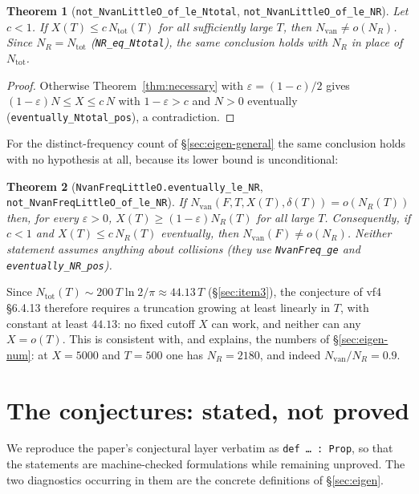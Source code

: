 \documentclass[11pt,a4paper]{article}
\newcommand{\lb}{\_\allowbreak}
\newcommand{\code}[1]{\texttt{#1}}
\newtheorem{theorem}{Theorem}[section]
\theoremstyle{definition}
\theoremstyle{remark}
\begin{document}
\begin{theorem}[\code{not\lb NvanLittleO\lb of\lb le\lb Ntotal},
\code{not\lb NvanLittleO\lb of\lb le\lb NR}]\label{thm:refute}
Let $c<1$.  If $X(T)\le c\,N_{\mathrm{tot}}(T)$ for all sufficiently large $T$, then
$N_{\mathrm{van}}\ne o(N_R)$.  Since $N_R=N_{\mathrm{tot}}$ (\code{NR\lb eq\lb Ntotal}), the
same conclusion holds with $N_R$ in place of $N_{\mathrm{tot}}$.
\end{theorem}
\begin{proof}
Otherwise Theorem~\ref{thm:necessary} with $\varepsilon=(1-c)/2$ gives
$(1-\varepsilon)N\le X\le c\,N$ with $1-\varepsilon>c$ and $N>0$ eventually
(\code{eventually\lb Ntotal\lb pos}), a contradiction.
\end{proof}

For the distinct-frequency count of \S\ref{sec:eigen-general} the same conclusion holds with
no hypothesis at all, because its lower bound is unconditional:

\begin{theorem}[\code{NvanFreqLittleO.eventually\lb le\lb NR},
\code{not\lb NvanFreqLittleO\lb of\lb le\lb NR}]
If $N_{\mathrm{van}}(F,T,X(T),\delta(T))=o(N_R(T))$ then, for every $\varepsilon>0$,
$X(T)\ge(1-\varepsilon)N_R(T)$ for all large $T$.  Consequently, if $c<1$ and
$X(T)\le c\,N_R(T)$ eventually, then $N_{\mathrm{van}}(F)\neq o(N_R)$.  Neither statement
assumes anything about collisions (they use \code{NvanFreq\lb ge} and
\code{eventually\lb NR\lb pos}).
\end{theorem}

\noindent
Since $N_{\mathrm{tot}}(T)\sim200\,T\ln2/\pi\approx44.13\,T$ (\S\ref{sec:item3}), the
conjecture of vf4 \S6.4.13 therefore requires a truncation growing at least linearly in $T$,
with constant at least $44.13$: no fixed cutoff $X$ can work, and neither can any $X=o(T)$.
This is consistent with, and explains, the numbers of \S\ref{sec:eigen-num}: at $X=5000$
and $T=500$ one has $N_R=2180$, and indeed $N_{\mathrm{van}}/N_R=0.9$.

\section{The conjectures: stated, not proved}\label{sec:conj}

We reproduce the paper's conjectural layer verbatim as \code{def \dots{} : Prop}, so that
the statements are machine-checked formulations while remaining unproved.  The two
diagnostics occurring in them are the concrete definitions of \S\ref{sec:eigen}.
\end{document}
